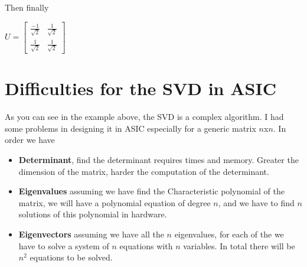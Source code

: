Then finally 

\begin{center}
	$ U=\begin{bmatrix}
	\frac{-1}{\sqrt{2}} & \frac{1}{\sqrt{2}}\\
	\frac{1}{\sqrt{2}} & \frac{1}{\sqrt{2}}
	\end{bmatrix} $
\end{center}
\section{Difficulties for the SVD in ASIC}
As you can see in the example above, the SVD is a complex algorithm. I had some problems in designing it in ASIC especially for a generic matrix $ n$x$n $.
In order we have
\begin{itemize}
	\item \textbf{Determinant}, find the determinant requires times and memory. Greater the dimension of the matrix, harder the computation of the determinant.
	\item \textbf{Eigenvalues} assuming we have find the Characteristic polynomial of the matrix, we will have a polynomial equation of degree $ n $, and we have to find $ n $ solutions of this polynomial in hardware.
	\item \textbf{Eigenvectors} assuming we have all the $ n $ eigenvalues, for each of the we have to solve a system of $n$ equations with $n$ variables. In total there will be $n^2$ equations to be solved.
\end{itemize}
